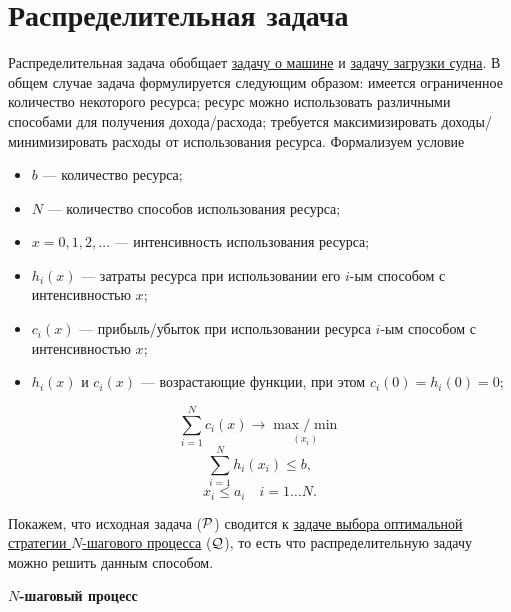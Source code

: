 \section{Распределительная задача}

\problem[распределительная]\label{pr:distribution}

Распределительная задача обобщает \hyperref[pr:car_on_island]{задачу о машине} и \hyperref[pr:loading_vessel]{задачу загрузки судна}. В общем случае задача формулируется следующим образом: имеется ограниченное количество некоторого ресурса; ресурс можно использовать различными способами для получения дохода/расхода; требуется максимизировать доходы/минимизировать расходы от использования ресурса. Формализуем условие

\begin{itemize}[nosep]
	\item $b$ --- количество ресурса;
	
	\item $N$ --- количество способов использования ресурса;
	
	\item $x = 0, 1, 2, \dots$ --- интенсивность использования ресурса;
	
	\item $h_i(x)$ --- затраты ресурса при использовании его $i$-ым способом с интенсивностью $x$;
	
	\item $c_i(x)$ --- прибыль/убыток при использовании ресурса $i$-ым способом с интенсивностью $x$;
	
	\item $h_i(x)$ и $c_i(x)$ --- возрастающие функции, при этом $c_i(0) = h_i(0) = 0$;
\end{itemize}

\[
\sum_{i=1}^{N}c_i(x) \to \underset{(x_i)}{\max / \min}
\]
\[
\sum_{i=1}^{N} h_i(x_i) \le b,
\]
\[
x_i \le a_i \quad i = 1 \dots N.
\]

\solution

Покажем, что исходная задача ($\P$) сводится к \hyperref[n_step_process]{задаче выбора оптимальной стратегии $N$-шагового процесса} ($\Q$), то есть что распределительную задачу можно решить данным способом.

\bigskip

\textbf{$N$-шаговый процесс}

